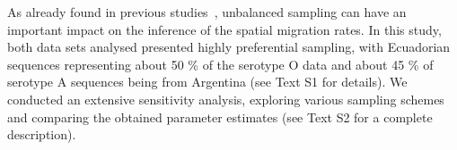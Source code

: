\documentclass[10pt]{article}
\begin{document}
% 
% 
As already found in previous studies~\cite{Faria2012, Lemey2014}, unbalanced sampling can have an important impact on the inference of the spatial migration rates.
In this study, both data sets analysed presented highly preferential sampling, with Ecuadorian sequences representing about 50 \% of the serotype O data and about 45 \% of serotype A sequences being from Argentina (see Text S1 for details).
We conducted an extensive sensitivity analysis, exploring various sampling schemes and comparing the obtained parameter estimates (see Text S2 for a complete description).
% 
% 
\end{document}
